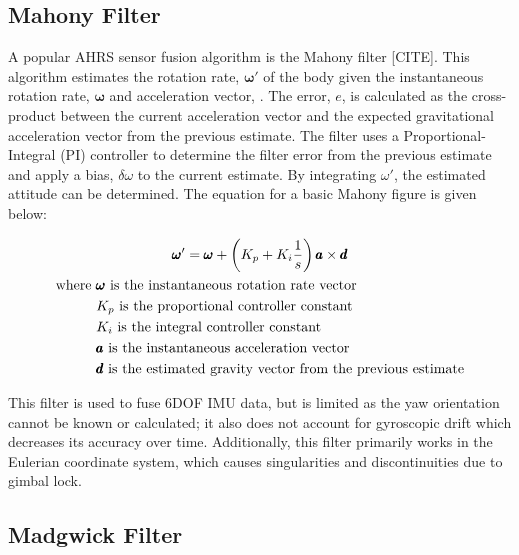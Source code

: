 \subsection{Mahony Filter} \label{ssec:mahony_filter}
A popular AHRS sensor fusion algorithm is the Mahony filter [CITE].
This algorithm estimates the rotation rate, $\pmb{\omega}'$ of the body given the instantaneous rotation rate, $\pmb{\omega}$ and acceleration vector, .
The error, $e$, is calculated as the cross-product between the current acceleration vector and the expected gravitational acceleration vector from the previous estimate.
The filter uses a Proportional-Integral (PI) controller to determine the filter error from the previous estimate and apply a bias, $\delta\omega$ to the current estimate.
By integrating $\omega'$, the estimated attitude can be determined.
The equation for a basic Mahony figure is given below:

\begin{gather}
    \label{eq:mahony_filter}
    \pmb{\omega}' = \pmb{\omega} + \left(K_p + K_i\frac{1}{s}\right) \pmb{a} \times \pmb{d} \\
    \begin{aligned}
        \text{where } & \pmb{\omega} \text{ is the instantaneous rotation rate vector} \\
        & K_p \text{ is the proportional controller constant} \\
        & K_i \text{ is the integral controller constant} \\
        & \pmb{a} \text{ is the instantaneous acceleration vector} \\
        & \pmb{d} \text{ is the estimated gravity vector from the previous estimate} \\
    \end{aligned} \notag
\end{gather}

This filter is used to fuse 6DOF IMU data, but is limited as the yaw orientation cannot be known or calculated; it also does not account for gyroscopic drift which decreases its accuracy over time.
Additionally, this filter primarily works in the Eulerian coordinate system, which causes singularities and discontinuities due to gimbal lock.

\subsection{Madgwick Filter} \label{ssec:madgewick_filter}
